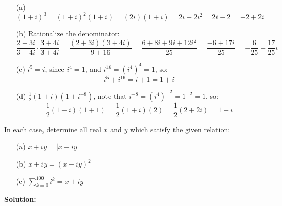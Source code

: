 \begin{itemize}
\item[(a)] \( (1 + i)^3 = (1 + i)^2 (1 + i) = (2i)(1 + i) = 2i + 2i^2 = 2i - 2 = -2 + 2i \)

\item[(b)] Rationalize the denominator:
\[
\frac{2 + 3i}{3 - 4i} \cdot \frac{3 + 4i}{3 + 4i} = \frac{(2 + 3i)(3 + 4i)}{9 + 16} = \frac{6 + 8i + 9i + 12i^2}{25} = \frac{-6 + 17i}{25} = -\frac{6}{25} + \frac{17}{25}i
\]

\item[(c)] \( i^5 = i \), since \( i^4 = 1 \), and \( i^{16} = (i^4)^4 = 1 \), so:
\[
i^5 + i^{16} = i + 1 = 1 + i
\]

\item[(d)] \( \frac{1}{2}(1 + i)(1 + i^{-8}) \), note that \( i^{-8} = (i^4)^{-2} = 1^{-2} = 1 \), so:
\[
\frac{1}{2}(1 + i)(1 + 1) = \frac{1}{2}(1 + i)(2) = \frac{1}{2}(2 + 2i) = 1 + i
\]
\end{itemize}

\begin{problembox}
In each case, determine all real \( x \) and \( y \) which satisfy the given relation:

\begin{enumerate}
\item[(a)] \( x + iy = |x - iy| \)
\item[(b)] \( x + iy = (x - iy)^2 \)
\item[(c)] \( \sum_{k=0}^{100} i^k = x + iy \)
\end{enumerate}
\end{problembox}

\textbf{Solution:}

